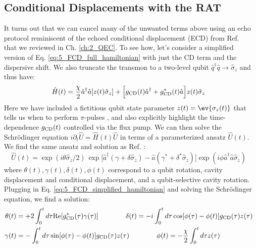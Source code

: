 \subsection{Conditional Displacements with the RAT}

It turns out that we can cancel many of the unwanted terms above using an echo protocol reminiscent of the echoed conditional displacement (ECD) from Ref. \cite{eickbusch2022fast} that we reviewed in Ch. \ref{ch:2_QEC}. To see how, let's consider a simplified version of Eq. \eqref{eq:5_FCD_full_hamiltonian} with just the CD term and the dispersive shift. We also truncate the transmon to a two-level qubit $\hat{q}^\dagger\hat{q} \to \hat{\sigma}_z$ and thus have:
\begin{equation}
\hat{H}(t) = \frac{\chi}{2}\hat{a}^\dagger\hat{a}[z(t)\hat{\sigma}_z]   + \Big[g_{\rm CD}(t)\hat{a}^\dagger + g_{\rm CD}^\ast(t)\hat{a}\Big]z(t)\hat{\sigma}_z
\label{eq:5_FCD_simplified_hamiltonian}
\end{equation}
Here we have included a fictitious qubit state parameter $z(t) = \ev{\sigma_z(t)}$ that tells us when to perform $\pi$-pulses \cite{eickbusch2022fast}, and also explicitly highlight the time-dependence $g_{\rm CD}(t)$ controlled via the flux pump. We can then solve the Schr\"odinger equation $i\partial_t\hat{U} = \hat{H}(t)\hat{U}$ in terms of a parameterized ansatz $\hat{U}(t)$. We find the same ansatz and solution as Ref. \cite{eickbusch2022fast}: 
\begin{equation}
    \hat{U}(t) = \exp(i\theta \hat{\sigma}_z / 2)\,\exp\!\Big[\hat{a}^\dagger(\gamma + \delta \hat{\sigma}_z) - \hat{a}(\gamma^\ast + \delta^\ast \hat{\sigma}_z)\Big]\exp(i\phi\hat{a}^\dagger\hat{a}\hat{\sigma}_z)
\end{equation}
where $\theta(t), \gamma(t), \delta(t), \phi(t)$ correspond to a qubit rotation, cavity displacement and conditional displacement, and a qubit-selective cavity rotation. Plugging in Eq. \eqref{eq:5_FCD_simplified_hamiltonian} and solving the Schr\"odinger equation, we find a solution:
\begin{align}
    \begin{split}
        \theta(t) & = +2 \int_0^t d\tau \mathrm{Re}[g_{\rm CD}^*(\tau)\gamma(\tau)] \qquad \qquad\delta(t) = -i \int_0^t d\tau \cos[\phi(\tau)-\phi(t)] g_{\rm CD}(\tau)z(\tau) \\\gamma(t) & = - \int_0^t d\tau \sin[\phi(\tau)-\phi(t)] g_{\rm CD}(\tau)z(\tau) \qquad \qquad\phi(t) = -\frac{\chi}{2} \int_0^t d\tau z(\tau)
    \end{split}
\end{align}
